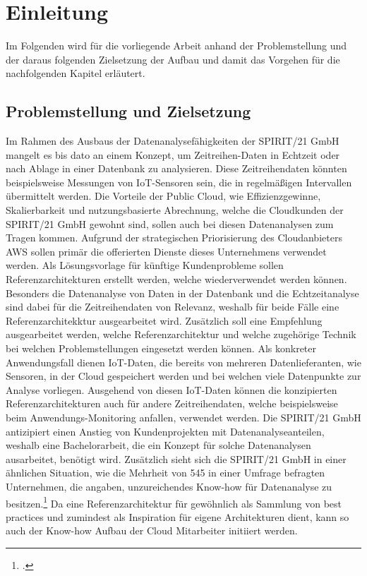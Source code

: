 \chapter{Einleitung}
Im Folgenden wird für die vorliegende Arbeit anhand der Problemstellung und der daraus folgenden Zielsetzung der Aufbau und damit das Vorgehen für die nachfolgenden Kapitel erläutert.
\section{Problemstellung und Zielsetzung}
Im Rahmen des Ausbaus der Datenanalysefähigkeiten der SPIRIT/21 GmbH mangelt es bis dato an einem Konzept, um
Zeitreihen-Daten in Echtzeit oder nach Ablage in einer Datenbank zu analysieren. 
Diese Zeitreihendaten könnten beispielsweise Messungen von \ac{IoT}-Sensoren sein, die in regelmäßigen Intervallen übermittelt werden. Die Vorteile der Public Cloud, wie Effizienzgewinne, Skalierbarkeit und nutzungsbasierte Abrechnung, welche die Cloudkunden der SPIRIT/21 GmbH gewohnt sind, sollen auch bei diesen Datenanalysen zum Tragen kommen. 
Aufgrund der strategischen Priorisierung des Cloudanbieters \acf{AWS} sollen primär die offerierten Dienste dieses Unternehmens verwendet werden.
Als Lösungsvorlage für künftige Kundenprobleme sollen Referenzarchitekturen erstellt werden, welche wiederverwendet werden können. 
Besonders die Datenanalyse von Daten in der Datenbank und die Echtzeitanalyse sind dabei für die
Zeitreihendaten von Relevanz, weshalb für beide Fälle eine Referenzarchitekktur ausgearbeitet wird.
Zusätzlich soll eine Empfehlung ausgearbeitet werden, welche Referenzarchitektur und welche
zugehörige Technik bei welchen Problemstellungen eingesetzt werden können. Als konkreter Anwendungsfall dienen \ac{IoT}-Daten, die bereits von mehreren Datenlieferanten, wie Sensoren, in der Cloud gespeichert werden und bei welchen viele Datenpunkte zur Analyse vorliegen. Ausgehend von diesen \ac{IoT}-Daten können die konzipierten Referenzarchitekturen auch für andere Zeitreihendaten, welche beispielsweise beim Anwendungs-Monitoring anfallen, verwendet werden. 
Die SPIRIT/21 GmbH antizipiert einen Anstieg von Kundenprojekten mit Datenanalyseanteilen, weshalb eine Bachelorarbeit, die ein Konzept für solche Datenanalysen ausarbeitet, benötigt wird. Zusätzlich sieht sich die SPIRIT/21 GmbH in einer ähnlichen Situation, wie die Mehrheit von 545 in einer Umfrage befragten Unternehmen, die angaben, unzureichendes Know-how für Datenanalyse zu besitzen.\footcite[Vgl.][]{o.V..o.J.} Da eine Referenzarchitektur für gewöhnlich als Sammlung von best practices und zumindest als Inspiration für eigene Architekturen dient, kann so auch der Know-how Aufbau der Cloud Mitarbeiter initiiert werden.

